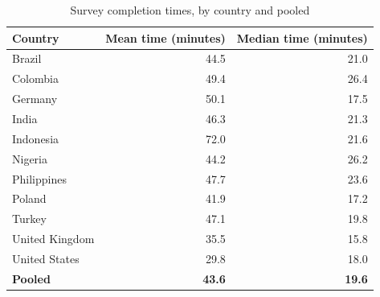 \begin{table}

\caption{\label{tab:survey-completion-times}Survey completion times, by country and pooled}
\centering
\begin{tabular}[t]{lrr}
\toprule
\textbf{Country} & \textbf{Mean time (minutes)} & \textbf{Median time (minutes)}\\
\midrule
Brazil & 44.5 & 21.0\\
Colombia & 49.4 & 26.4\\
Germany & 50.1 & 17.5\\
India & 46.3 & 21.3\\
Indonesia & 72.0 & 21.6\\
Nigeria & 44.2 & 26.2\\
Philippines & 47.7 & 23.6\\
Poland & 41.9 & 17.2\\
Turkey & 47.1 & 19.8\\
United Kingdom & 35.5 & 15.8\\
United States & 29.8 & 18.0\\
\textbf{Pooled} & \textbf{43.6} & \textbf{19.6}\\
\bottomrule
\end{tabular}
\end{table}

